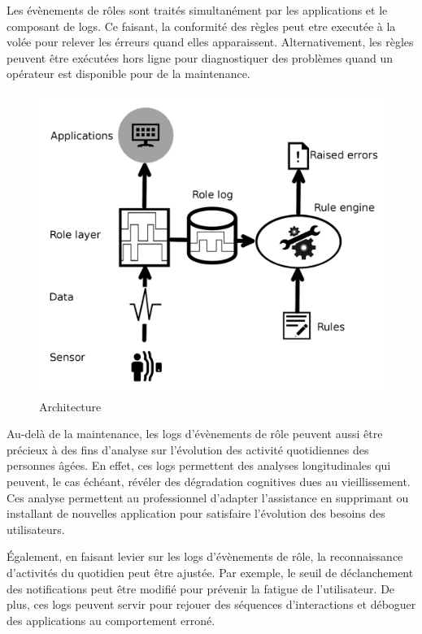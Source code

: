 Les évènements de rôles sont traités simultanément par les applications et le composant de logs. Ce faisant, la conformité des règles peut etre executée à la volée pour relever les érreurs quand elles apparaissent. Alternativement, les règles peuvent être exécutées hors ligne pour diagnostiquer des problèmes quand un opérateur est disponible pour de la maintenance.

\begin{figure}[!h]
  \centering
  \includegraphics[scale=0.15]{gfx/architecture.png}
  \caption{Architecture}
  \label{fig:archi}
\end{figure}

Au-delà de la maintenance, les logs d'évènements de rôle peuvent aussi être précieux à des fins d'analyse sur l'évolution des activité quotidiennes des personnes âgées. En effet, ces logs permettent des analyses longitudinales qui peuvent, le cas échéant, révéler des dégradation cognitives dues au vieillissement. Ces analyse permettent au professionnel d'adapter l'assistance en supprimant ou installant de nouvelles application pour satisfaire l'évolution des besoins des utilisateurs. 

Également, en faisant levier sur les logs d'évènements de rôle, la reconnaissance d'activités du quotidien peut être ajustée. Par exemple, le seuil de déclanchement des notifications peut être modifié pour prévenir la fatigue de l'utilisateur. De plus, ces logs peuvent servir pour rejouer des séquences d'interactions et déboguer des applications au comportement erroné.


